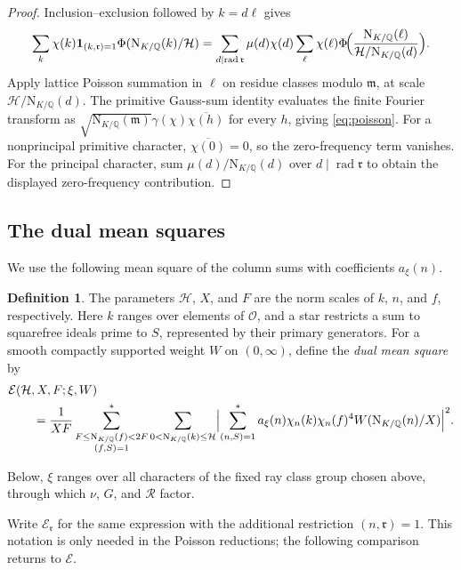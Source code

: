 \documentclass[11pt,a4paper]{article}
\numberwithin{equation}{section}
\numberwithin{figure}{section}
\theoremstyle{definition}
\newtheorem{definition}[theorem]{Definition}
\theoremstyle{remark}
\newcommand{\Q}{\mathbb Q}
\newcommand{\NK}{\mathrm N_{K/\Q}}
\newcommand{\OO}{\mathcal O}
\newcommand{\E}{\mathcal E}
\newcommand{\ind}{\mathbf1}
\newcommand{\rad}{\operatorname{rad}}
\begin{document}
\begin{proof}
Inclusion--exclusion followed by $k=d\ell$ gives
\[
 \sum_k\chi(k)\ind_{(k,\mathfrak r)=1}\Phi(\NK(k)/\mathcal{H})
 =\sum_{d\mid\rad \mathfrak r}\mu(d)\chi(d)
       \sum_\ell\chi(\ell)\Phi\!\Bigl(\frac{\NK(\ell)}{\mathcal{H}/\NK(d)}\Bigr).
\]
Apply lattice Poisson summation \cite[Theorem~4.5]{IK04} in $\ell$
on residue classes modulo $\mathfrak m$, at scale $\mathcal H/\NK(d)$.
The primitive Gauss-sum identity \cite[(3.12)]{IK04} evaluates the
finite Fourier transform as
$\sqrt{\NK(\mathfrak m)}\gamma(\chi)\overline{\chi(h)}$
for every $h$, giving \eqref{eq:poisson}. For a nonprincipal primitive
character, $\overline{\chi(0)}=0$, so the zero-frequency term vanishes.
For the principal character, sum $\mu(d)/\NK(d)$ over
$d\mid\rad \mathfrak r$ to obtain the displayed zero-frequency contribution.
\end{proof}

\subsection{The dual mean squares} 
We use the following mean square of the column sums with
coefficients $a_\xi(n)$.

\begin{definition}
The parameters $\mathcal H$, $X$, and $F$ are the norm scales of
$k$, $n$, and $f$, respectively. Here $k$ ranges over elements of
$\OO$, and a star restricts a sum to squarefree ideals prime to $S$,
represented by their primary generators. For a smooth compactly
supported weight $W$ on $(0,\infty)$, define the \emph{dual mean square} by
\begin{equation}\label{eq:energy}
 \begin{aligned}
 &\E(\mathcal{H},X,F;\xi,W)\\
 &\qquad=\frac1{XF}
 \sum_{\substack{F\le\NK(f)<2F\\(f,S)=1}}^*\sum_{0<\NK(k)\le \mathcal{H}}
 \Bigl|\sum_{(n,S)=1}^*a_\xi(n)\chi_n(k)\chi_n(f)^4
                  W(\NK(n)/X)\Bigr|^2.
 \end{aligned}
\end{equation}
\end{definition}

Below, $\xi$ ranges over all characters of the fixed ray class group
chosen above, through which $\nu$, $G$, and $\mathcal R$ factor.

Write $\E_{\mathfrak r}$ for the same expression with the additional
restriction $(n,\mathfrak r)=1$. This notation is only needed in the
Poisson reductions; the following comparison returns to $\E$.
\end{document}
